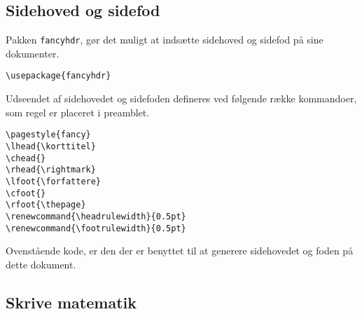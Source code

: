 \documentclass[11pt,a4paper,fleqn]{article}
\renewcommand{\headrulewidth}{0.5pt}
\renewcommand{\footrulewidth}{0.5pt}
\numberwithin{equation}{section}
\newcommand{\forfattere}{Henrik Skov Midtiby}
\newcommand{\korttitel}{Latex rodebunke}
\begin{document}
\subsection{Sidehoved og sidefod}

Pakken \verb!fancyhdr!, gør det muligt at indsætte sidehoved og
sidefod på sine dokumenter.
%
\begin{lstlisting}
\usepackage{fancyhdr}
\end{lstlisting}
%
Udseendet af sidehovedet og sidefoden defineres ved følgende række
kommandoer, som regel er placeret i preamblet.
%
\begin{lstlisting}
\pagestyle{fancy}
\lhead{\korttitel}
\chead{}
\rhead{\rightmark}
\lfoot{\forfattere}
\cfoot{}
\rfoot{\thepage}
\renewcommand{\headrulewidth}{0.5pt}
\renewcommand{\footrulewidth}{0.5pt}
\end{lstlisting}
%
Ovenstående kode, er den der er benyttet til at generere sidehovedet
og foden på dette dokument.

\subsection{Skrive matematik}
\end{document}
